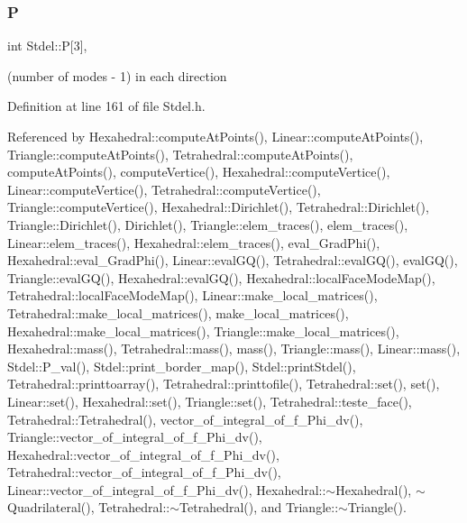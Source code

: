 \mbox{\label{classStdel_a05cbb3f2a3fa0bc04a74e347dc6574cf}} 
\subsubsection{\texorpdfstring{P}{P}}
{\footnotesize\ttfamily int Stdel\+::P\mbox{[}3\mbox{]}\hspace{0.3cm}{\ttfamily [protected]}, {\ttfamily [inherited]}}



(number of modes -\/ 1) in each direction 



Definition at line 161 of file Stdel.\+h.



Referenced by Hexahedral\+::compute\+At\+Points(), Linear\+::compute\+At\+Points(), Triangle\+::compute\+At\+Points(), Tetrahedral\+::compute\+At\+Points(), compute\+At\+Points(), compute\+Vertice(), Hexahedral\+::compute\+Vertice(), Linear\+::compute\+Vertice(), Tetrahedral\+::compute\+Vertice(), Triangle\+::compute\+Vertice(), Hexahedral\+::\+Dirichlet(), Tetrahedral\+::\+Dirichlet(), Triangle\+::\+Dirichlet(), Dirichlet(), Triangle\+::elem\+\_\+traces(), elem\+\_\+traces(), Linear\+::elem\+\_\+traces(), Hexahedral\+::elem\+\_\+traces(), eval\+\_\+\+Grad\+Phi(), Hexahedral\+::eval\+\_\+\+Grad\+Phi(), Linear\+::eval\+G\+Q(), Tetrahedral\+::eval\+G\+Q(), eval\+G\+Q(), Triangle\+::eval\+G\+Q(), Hexahedral\+::eval\+G\+Q(), Hexahedral\+::local\+Face\+Mode\+Map(), Tetrahedral\+::local\+Face\+Mode\+Map(), Linear\+::make\+\_\+local\+\_\+matrices(), Tetrahedral\+::make\+\_\+local\+\_\+matrices(), make\+\_\+local\+\_\+matrices(), Hexahedral\+::make\+\_\+local\+\_\+matrices(), Triangle\+::make\+\_\+local\+\_\+matrices(), Hexahedral\+::mass(), Tetrahedral\+::mass(), mass(), Triangle\+::mass(), Linear\+::mass(), Stdel\+::\+P\+\_\+val(), Stdel\+::print\+\_\+border\+\_\+map(), Stdel\+::print\+Stdel(), Tetrahedral\+::printtoarray(), Tetrahedral\+::printtofile(), Tetrahedral\+::set(), set(), Linear\+::set(), Hexahedral\+::set(), Triangle\+::set(), Tetrahedral\+::teste\+\_\+face(), Tetrahedral\+::\+Tetrahedral(), vector\+\_\+of\+\_\+integral\+\_\+of\+\_\+f\+\_\+\+Phi\+\_\+dv(), Triangle\+::vector\+\_\+of\+\_\+integral\+\_\+of\+\_\+f\+\_\+\+Phi\+\_\+dv(), Hexahedral\+::vector\+\_\+of\+\_\+integral\+\_\+of\+\_\+f\+\_\+\+Phi\+\_\+dv(), Tetrahedral\+::vector\+\_\+of\+\_\+integral\+\_\+of\+\_\+f\+\_\+\+Phi\+\_\+dv(), Linear\+::vector\+\_\+of\+\_\+integral\+\_\+of\+\_\+f\+\_\+\+Phi\+\_\+dv(), Hexahedral\+::$\sim$\+Hexahedral(), $\sim$\+Quadrilateral(), Tetrahedral\+::$\sim$\+Tetrahedral(), and Triangle\+::$\sim$\+Triangle().


